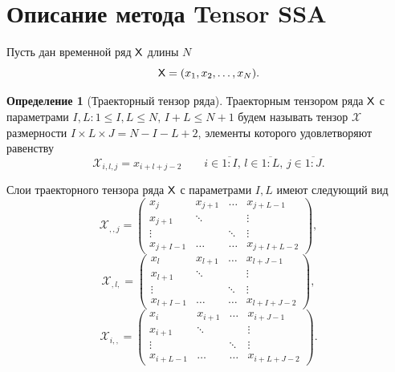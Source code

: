 \documentclass[specialist,
    substylefile = spbu_report.rtx,
    subf,href,colorlinks=true, 12pt]{disser}
\theoremstyle{plain}
\theoremstyle{definition}
\newtheorem{definition}{Определение}[section]
\theoremstyle{remark}
\begin{document}
    \section{Описание метода Tensor SSA}\label{sec:Tensor SSA-method-description}
    Пусть дан временной ряд $\mathsf{X}$ длины $N$
    \[
        \mathsf{X}=(x_1,x_2,\ldots,x_N).
    \]
    \begin{definition}[Траекторный тензор ряда]
        Траекторным тензором ряда $\mathsf{X}$ с параметрами $I,L: 1\leqslant I,L \leqslant N,\, I + L \leqslant N + 1$
        будем называть тензор $\mathcal{X}$ размерности $I\times L \times J=N-I-L+2$, элементы которого удовлетворяют равенству
        \[
            \mathcal{X}_{i,l,j}=x_{i+l+j-2}\qquad i\in \overline{1:I},\, l \in\overline{1:L},\, j \in\overline{1:J}.
        \]
    \end{definition}
    Слои траекторного тензора ряда $\mathsf{X}$ с параметрами $I, L$ имеют следующий вид
    \[
        \mathcal{X}_{,,j}=
        \begin{pmatrix}
            x_j       & x_{j+1} & \ldots & x_{j+L-1}   \\
            x_{j+1}   & \ddots  &        & \vdots      \\
            \vdots    &         & \ddots & \vdots      \\
            x_{j+I-1} & \ldots  & \ldots & x_{j+I+L-2}
        \end{pmatrix},\]
    \[
        \mathcal{X}_{,l,}=
        \begin{pmatrix}
            x_l       & x_{l+1} & \ldots & x_{l+J-1}   \\
            x_{l+1}   & \ddots  &        & \vdots      \\
            \vdots    &         & \ddots & \vdots      \\
            x_{l+I-1} & \ldots  & \ldots & x_{l+I+J-2}
        \end{pmatrix},
    \]
    \[
        \mathcal{X}_{i,,}=
        \begin{pmatrix}
            x_i       & x_{i+1} & \ldots & x_{i+J-1}   \\
            x_{i+1}   & \ddots  &        & \vdots      \\
            \vdots    &         & \ddots & \vdots      \\
            x_{i+L-1} & \ldots  & \ldots & x_{i+L+J-2}
        \end{pmatrix}.
    \]
\end{document}
